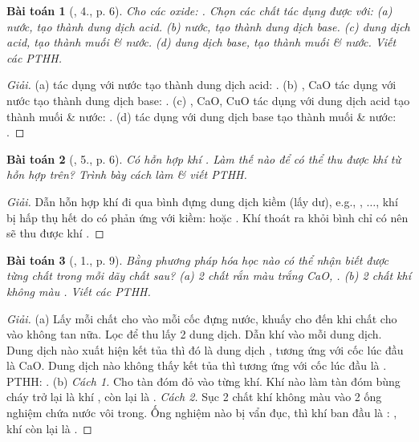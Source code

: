 \documentclass{article}
\newtheorem{baitoan}{Bài toán}
\begin{document}
\begin{baitoan}[\cite{SGK_Hoa_Hoc_9}, 4., p. 6]
	Cho các oxide: \emph{}. Chọn các chất tác dụng được với: (a) nước, tạo thành dung dịch acid. (b) nước, tạo thành dung dịch base. (c) dung dịch acid, tạo thành muối \& nước. (d) dung dịch base, tạo thành muối \& nước. Viết các PTHH.
\end{baitoan}

\begin{proof}[Giải]
	(a)  tác dụng với nước tạo thành dung dịch acid: . (b) , CaO tác dụng với nước tạo thành dung dịch base: . (c) , CaO, CuO tác dụng với dung dịch acid tạo thành muối \& nước: . (d)  tác dụng với dung dịch base tạo thành muối \& nước: .
\end{proof}

\begin{baitoan}[\cite{SGK_Hoa_Hoc_9}, 5., p. 6]
	Có hỗn hợp khí \emph{}. Làm thế nào để có thể thu được khí \emph{} từ hỗn hợp trên? Trình bày cách làm \& viết PTHH.
\end{baitoan}

\begin{proof}[Giải]
	Dẫn hỗn hợp khí  đi qua bình đựng dung dịch kiềm (lấy dư), e.g., , $\ldots$, khí  bị hấp thụ hết do có phản ứng với kiềm:  hoặc . Khí thoát ra khỏi bình chỉ có  nên sẽ thu được khí .
\end{proof}

\begin{baitoan}[\cite{SGK_Hoa_Hoc_9}, 1., p. 9]
	Bằng phương pháp hóa học nào có thể nhận biết được từng chất trong mỗi dãy chất sau? (a) 2 chất rắn màu trắng \emph{CaO, }. (b) 2 chất khí không màu \emph{}. Viết các PTHH.
\end{baitoan}

\begin{proof}[Giải]
	(a) Lấy mỗi chất cho vào mỗi cốc đựng nước, khuấy cho đến khi chất cho vào không tan nữa. Lọc để thu lấy 2 dung dịch. Dẫn khí  vào mỗi dung dịch. Dung dịch nào xuất hiện kết tủa thì đó là dung dịch , tương ứng với cốc lúc đầu là CaO. Dung dịch nào không thấy kết tủa thì tương ứng với cốc lúc đầu là . PTHH: . (b) \textit{Cách 1.} Cho tàn đóm đỏ vào từng khí. Khí nào làm tàn đóm bùng cháy trở lại là khí , còn lại là . \textit{Cách 2.} Sục 2 chất khí không màu vào 2 ống nghiệm chứa nước vôi  trong. Ống nghiệm nào bị vẩn đục, thì khí ban đầu là : , khí còn lại là .
\end{proof}
\end{document}
